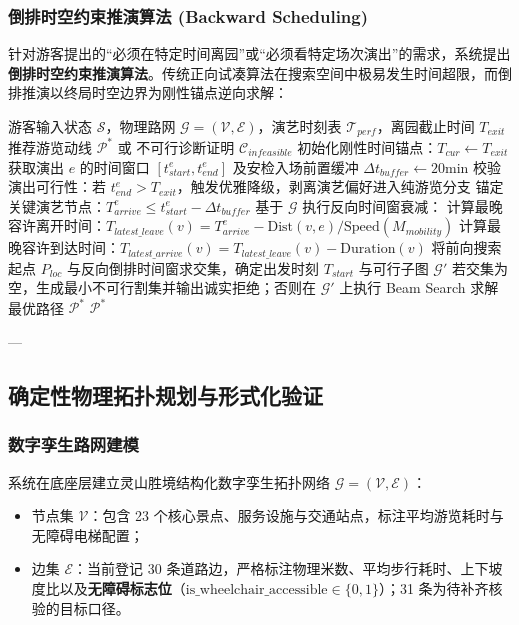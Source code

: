 \documentclass[11pt,a4paper]{ctexart}
\begin{document}
\subsubsection{倒排时空约束推演算法 (Backward Scheduling)}
针对游客提出的“必须在特定时间离园”或“必须看特定场次演出”的需求，系统提出\textbf{倒排时空约束推演算法}。传统正向试凑算法在搜索空间中极易发生时间超限，而倒排推演以终局时空边界为刚性锚点逆向求解：

\begin{algorithm}[H]
\small
\caption{倒排时空约束推演算法 (Backward Scheduling)}
\begin{algorithmic}[1]
\Require 游客输入状态 $\mathcal{S}$，物理路网 $\mathcal{G}=(\mathcal{V}, \mathcal{E})$，演艺时刻表 $\mathcal{T}_{perf}$，离园截止时间 $T_{exit}$
\Ensure 推荐游览动线 $\mathcal{P}^*$ 或 不可行诊断证明 $\mathcal{C}_{infeasible}$
\State 初始化刚性时间锚点：$T_{cur} \leftarrow T_{exit}$
    \State 获取演出 $e$ 的时间窗口 $[t_{start}^e, t_{end}^e]$ 及安检入场前置缓冲 $\Delta t_{buffer} \leftarrow 20\text{min}$
    \State 校验演出可行性：若 $t_{end}^e > T_{exit}$，触发优雅降级，剥离演艺偏好进入纯游览分支
    \State 锚定关键演艺节点：$T_{arrive}^e \le t_{start}^e - \Delta t_{buffer}$
\EndIf
\State 基于 $\mathcal{G}$ 执行反向时间窗衰减：
    \State 计算最晚容许离开时间：$T_{latest\_leave}(v) = T_{arrive}^e - \text{Dist}(v, e) / \text{Speed}(M_{mobility})$
    \State 计算最晚容许到达时间：$T_{latest\_arrive}(v) = T_{latest\_leave}(v) - \text{Duration}(v)$
\EndFor
\State 将前向搜索起点 $P_{loc}$ 与反向倒排时间窗求交集，确定出发时刻 $T_{start}$ 与可行子图 $\mathcal{G}'$
\State 若交集为空，生成最小不可行割集并输出诚实拒绝；否则在 $\mathcal{G}'$ 上执行 Beam Search 求解最优路径 $\mathcal{P}^*$
\State \Return $\mathcal{P}^*$
\end{algorithmic}
\end{algorithm}

---

\subsection{确定性物理拓扑规划与形式化验证}

\subsubsection{数字孪生路网建模}
系统在底座层建立灵山胜境结构化数字孪生拓扑网络 $\mathcal{G}=(\mathcal{V}, \mathcal{E})$：
\begin{itemize}
    \item 节点集 $\mathcal{V}$：包含 23 个核心景点、服务设施与交通站点，标注平均游览耗时与无障碍电梯配置；
    \item 边集 $\mathcal{E}$：当前登记 30 条道路边，严格标注物理米数、平均步行耗时、上下坡度比以及\textbf{无障碍标志位}（$\text{is\_wheelchair\_accessible} \in \{0, 1\}$）；31 条为待补齐核验的目标口径。
\end{itemize}
\end{document}

